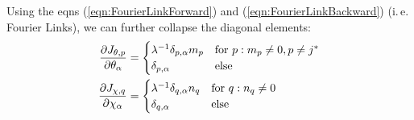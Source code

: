 \documentclass[
	english,
	a4paper,
	fontsize=10pt,
	parskip=half,
	titlepage=true,
	DIV=12,
	final
]{scrreprt}
\newcommand*{\ie}{i.\,e.\xspace}
\begin{document}
Using the eqns (\ref{eqn:FourierLinkForward}) and (\ref{eqn:FourierLinkBackward}) (\ie Fourier Links), we can further collapse the diagonal elements:
\begin{align}
	\pdv{J_{\theta, p}}{\theta_{\alpha}}
&=
	\begin{cases}
			\lambda^{-1}
			\delta_{p,\alpha}
			m_p
		&
			\text{for } p : m_p \neq 0, p \neq j^*
		\\
			\delta_{p,\alpha}
		&
			\text{else}
	\end{cases}
\\
	\pdv{J_{\chi, q}}{\chi_{\alpha}}
&=
	\begin{cases}
		\lambda^{-1}
		\delta_{q,\alpha}
		n_q
	&
		\text{for } q : n_q \neq 0
	\\
		\delta_{q,\alpha}
	&
		\text{else}
	\end{cases}
\end{align}
\end{document}
